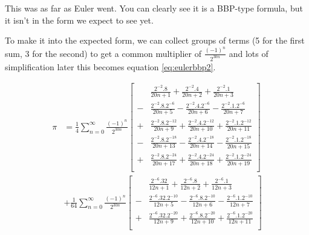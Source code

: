 \documentclass[11pt]{article}
\begin{document}
This was as far as Euler went. You can clearly see it is a BBP-type formula, but it isn't in the form we expect to see yet.

To make it into the expected form, we can collect groups of terms (5 for the first sum, 3 for the second) to get a common multiplier of $\frac{(-1)^n}{2^{30n}}$ and lots of simplification later this becomes equation \eqref{eq:eulerbbp2}.

\iffalse                        %

\begin{equation}
\begin{split}
  \pi
  &= \frac{1}{4} \sum_{n = 0}^\infty \frac{(-1)^n}{2^{30n}} \left[
    \begin{aligned}
    &  \frac{2^{-2}.8}{20n+1}
    +  \frac{2^{-2}.4}{20n+2}
    +  \frac{2^{-2}.1}{20n+3} \\
    -& \frac{2^{-2}.8.2^{-6}}{20n+5}
    -  \frac{2^{-2}.4.2^{-6}}{20n+6}
    -  \frac{2^{-2}.1.2^{-6}}{20n+7} \\
    +& \frac{2^{-2}.8.2^{-12}}{20n+9}
    +  \frac{2^{-2}.4.2^{-12}}{20n+10}
    +  \frac{2^{-2}.1.2^{-12}}{20n+11} \\
    -& \frac{2^{-2}.8.2^{-18}}{20n+13} 
    -  \frac{2^{-2}.4.2^{-18}}{20n+14}
    -  \frac{2^{-2}.1.2^{-18}}{20n+15} \\
    +& \frac{2^{-2}.8.2^{-24}}{20n+17}
    +  \frac{2^{-2}.4.2^{-24}}{20n+18}
    +  \frac{2^{-2}.1.2^{-24}}{20n+19} \\
    \end{aligned}
  \right] \\
  &+ \frac{1}{64} \sum_{n = 0}^\infty \frac{(-1)^n}{2^{30n}} \left[
    \begin{aligned}
    &  \frac{2^{-6}.32}{12n+1}
    +  \frac{2^{-6}.8}{12n+2}
    +  \frac{2^{-6}.1}{12n+3} \\
    -& \frac{2^{-6}.32.2^{-10}}{12n+5}
    -  \frac{2^{-6}.8.2^{-10}}{12n+6}
    -  \frac{2^{-6}.1.2^{-10}}{12n+7} \\
    +& \frac{2^{-6}.32.2^{-20}}{12n+9}
    +  \frac{2^{-6}.8.2^{-20}}{12n+10}
    +  \frac{2^{-6}.1.2^{-20}}{12n+11} \\
    \end{aligned}
  \right]
\end{split}
\end{equation}
\end{document}
